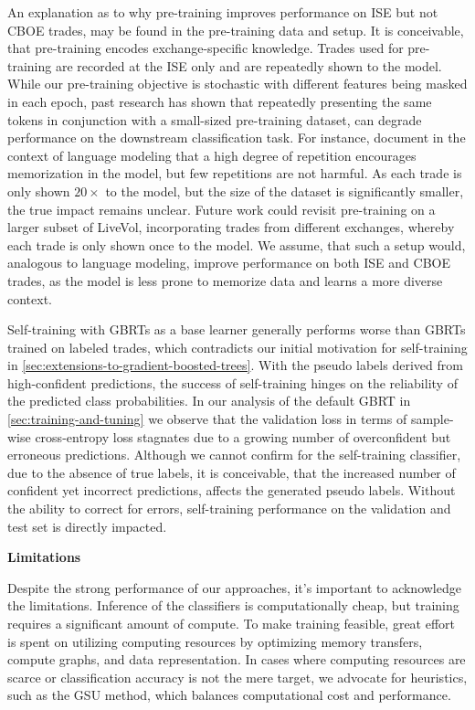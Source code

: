 An explanation as to why pre-training improves performance on \gls{ISE} but not \gls{CBOE} trades, may be found in the pre-training data and setup. It is conceivable, that pre-training encodes exchange-specific knowledge. Trades used for pre-training are recorded at the \gls{ISE} only and are repeatedly shown to the model. While our pre-training objective is stochastic with different features being masked in each epoch, past research has shown that repeatedly presenting the same tokens in conjunction with a small-sized pre-training dataset, can degrade performance on the downstream classification task. For instance, \textcite[][27--28]{raffelExploringLimitsTransfer2020} document in the context of language modeling that a high degree of repetition encourages memorization in the model, but few repetitions are not harmful. As each trade is only shown $20\times$ to the model, but the size of the dataset is significantly smaller, the true impact remains unclear. Future work could revisit pre-training on a larger subset of LiveVol, incorporating trades from different exchanges, whereby each trade is only shown once to the model. We assume, that such a setup would, analogous to language modeling, improve performance on both \gls{ISE} and \gls{CBOE} trades, as the model is less prone to memorize data and learns a more diverse context.

Self-training with \glspl{GBRT} as a base learner generally performs worse than \glspl{GBRT} trained on labeled trades, which contradicts our initial motivation for self-training in \cref{sec:extensions-to-gradient-boosted-trees}. With the pseudo labels derived from high-confident predictions, the success of self-training hinges on the reliability of the predicted class probabilities. In our analysis of the default \gls{GBRT} in \cref{sec:training-and-tuning} we observe that the validation loss in terms of sample-wise cross-entropy loss stagnates due to a growing number of overconfident but erroneous predictions. Although we cannot confirm for the self-training classifier, due to the absence of true labels, it is conceivable, that the increased number of confident yet incorrect predictions, affects the generated pseudo labels. Without the ability to correct for errors, self-training performance on the validation and test set is directly impacted.

\textbf{Limitations}

Despite the strong performance of our approaches, it's important to acknowledge the limitations. Inference of the classifiers is computationally cheap, but training requires a significant amount of compute. To make training feasible, great effort is spent on utilizing computing resources by optimizing memory transfers, compute graphs, and data representation. In cases where computing resources are scarce or classification accuracy is not the mere target, we advocate for heuristics, such as the \gls{GSU} method, which balances computational cost and performance.

